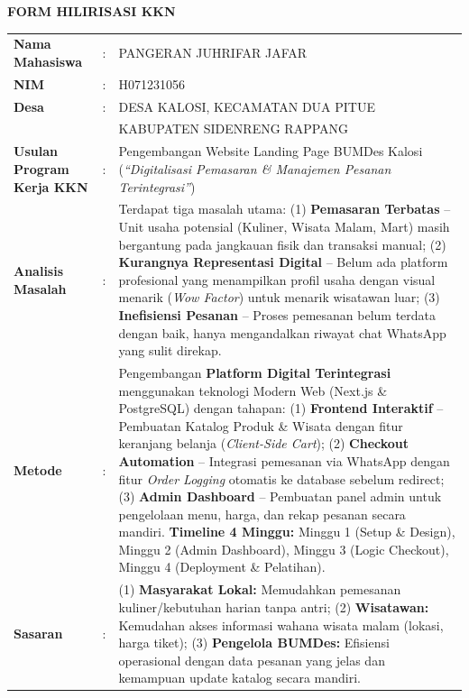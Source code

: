 \documentclass[12pt,a4paper]{article}
\begin{document}
\begin{center}
    \textbf{\Large FORM HILIRISASI KKN}
\end{center}

\vspace{1cm}

\begin{tabularx}{\textwidth}{@{}L{5.5cm}cL{10cm}@{}}
\textbf{Nama Mahasiswa} & : & PANGERAN JUHRIFAR JAFAR \\[0.3cm]

\textbf{NIM} & : & H071231056 \\[0.3cm]

\textbf{Desa} & : & DESA KALOSI, KECAMATAN DUA PITUE\\
& & KABUPATEN SIDENRENG RAPPANG \\[0.3cm]

\textbf{Usulan Program Kerja KKN} & : & Pengembangan Website Landing Page BUMDes Kalosi (\textit{``Digitalisasi Pemasaran \& Manajemen Pesanan Terintegrasi''}) \\[0.3cm]

\textbf{Analisis Masalah} & : & Terdapat tiga masalah utama: (1) \textbf{Pemasaran Terbatas} -- Unit usaha potensial (Kuliner, Wisata Malam, Mart) masih bergantung pada jangkauan fisik dan transaksi manual; (2) \textbf{Kurangnya Representasi Digital} -- Belum ada platform profesional yang menampilkan profil usaha dengan visual menarik (\textit{Wow Factor}) untuk menarik wisatawan luar; (3) \textbf{Inefisiensi Pesanan} -- Proses pemesanan belum terdata dengan baik, hanya mengandalkan riwayat chat WhatsApp yang sulit direkap. \\[0.3cm]

\textbf{Metode} & : & Pengembangan \textbf{Platform Digital Terintegrasi} menggunakan teknologi Modern Web (Next.js \& PostgreSQL) dengan tahapan: (1) \textbf{Frontend Interaktif} -- Pembuatan Katalog Produk \& Wisata dengan fitur keranjang belanja (\textit{Client-Side Cart}); (2) \textbf{Checkout Automation} -- Integrasi pemesanan via WhatsApp dengan fitur \textit{Order Logging} otomatis ke database sebelum redirect; (3) \textbf{Admin Dashboard} -- Pembuatan panel admin untuk pengelolaan menu, harga, dan rekap pesanan secara mandiri. \textbf{Timeline 4 Minggu:} Minggu 1 (Setup \& Design), Minggu 2 (Admin Dashboard), Minggu 3 (Logic Checkout), Minggu 4 (Deployment \& Pelatihan). \\[0.3cm]

\textbf{Sasaran} & : & (1) \textbf{Masyarakat Lokal:} Memudahkan pemesanan kuliner/kebutuhan harian tanpa antri; (2) \textbf{Wisatawan:} Kemudahan akses informasi wahana wisata malam (lokasi, harga tiket); (3) \textbf{Pengelola BUMDes:} Efisiensi operasional dengan data pesanan yang jelas dan kemampuan update katalog secara mandiri. \\[0.3cm]


\end{tabularx}
\end{document}
